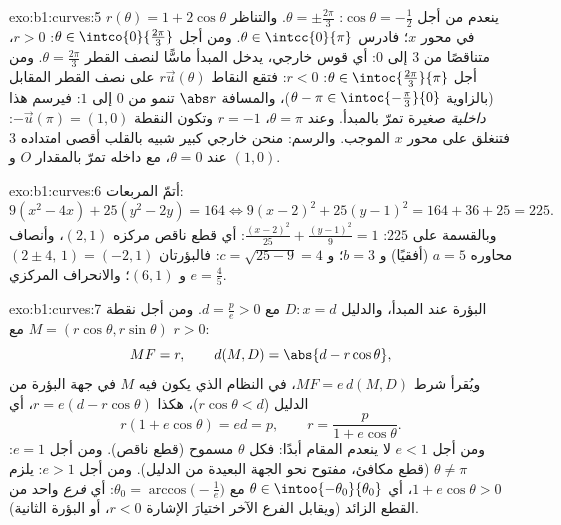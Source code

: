 \begin{solution}{exo:b1:curves:5}
$r(\theta) = 1 + 2\cos\theta$ ينعدم من أجل $\cos\theta = -\frac12$:
$\theta = \pm\frac{2\pi}{3}$. والتناظر في محور $x$؛ فادرس
$\theta \in \intcc{0}{\pi}$. ومن أجل $\theta \in
\intco{0}{\frac{2\pi}{3}}$: $r > 0$، متناقصًا من $3$ إلى $0$:
أي قوس خارجي، يدخل المبدأ ماسًّا لنصف القطر $\theta =
\frac{2\pi}{3}$. ومن أجل $\theta \in \intoc{\frac{2\pi}{3}}{\pi}$: $r <
0$: فتقع النقاط $r\vec u(\theta)$ على نصف القطر المقابل (بالزاوية
$\theta - \pi \in \intoc{-\frac\pi3}{0}$)، والمسافة $\abs r$
تنمو من $0$ إلى $1$: فيرسم هذا \emph{ داخلية} صغيرة
تمرّ بالمبدأ. وعند $\theta = \pi$، $r = -1$ وتكون النقطة
$-\vec u(\pi) = (1, 0)$: فتنغلق  على محور $x$ الموجب.
والرسم: منحن خارجي كبير شبيه بالقلب
أقصى امتداده $3$ عند $\theta = 0$، مع  داخله
تمرّ بالمقدار $O$ و $(1,0)$.
\end{solution}

\begin{solution}{exo:b1:curves:6}
أتمّ المربعات:
\[
9(x^2 - 4x) + 25(y^2 - 2y) = 164
\iff 9(x-2)^2 + 25(y-1)^2 = 164 + 36 + 25 = 225 .
\]
وبالقسمة على $225$: $\frac{(x-2)^2}{25} + \frac{(y-1)^2}{9} = 1$: أي قطع
ناقص مركزه $(2, 1)$، وأنصاف محاوره $a = 5$ (أفقيًا) و $b =
3$؛ و $c = \sqrt{25 - 9} = 4$: فالبؤرتان $(2 \pm 4,\, 1) = (-2, 1)$ و
$(6, 1)$؛ والانحراف المركزي $e = \frac45$.
\end{solution}

\begin{solution}{exo:b1:curves:7}
البؤرة عند المبدأ، والدليل $D: x = d$ مع $d = \frac pe > 0$.
ومن أجل نقطة $M = (r\cos\theta, r\sin\theta)$ مع $r > 0$:
\[
MF = r,
\qquad
d(M, D) = \abs{d - r\cos\theta},
\]
ويُقرأ شرط  $MF = e\,d(M, D)$، في النظام الذي يكون فيه $M$
في جهة البؤرة من الدليل ($r\cos\theta < d$)، هكذا $r
= e(d - r\cos\theta)$، أي
\[
r(1 + e\cos\theta) = ed = p,
\qquad
r = \frac{p}{1 + e\cos\theta} .
\]
ومن أجل $e < 1$ لا ينعدم المقام أبدًا: فكل $\theta$ مسموح
(قطع ناقص). ومن أجل $e = 1$: $\theta \neq \pi$ (قطع مكافئ، مفتوح نحو
الجهة البعيدة من الدليل). ومن أجل $e > 1$: يلزم $1 + e\cos\theta > 0$،
أي $\theta \in \intoo{-\theta_0}{\theta_0}$ مع $\theta_0 =
\arccos\bigl(-\frac1e\bigr)$: أي \emph{فرع} واحد من القطع الزائد
(ويقابل الفرع الآخر اختيارَ الإشارة $r < 0$، أو
البؤرة الثانية).
\end{solution}

